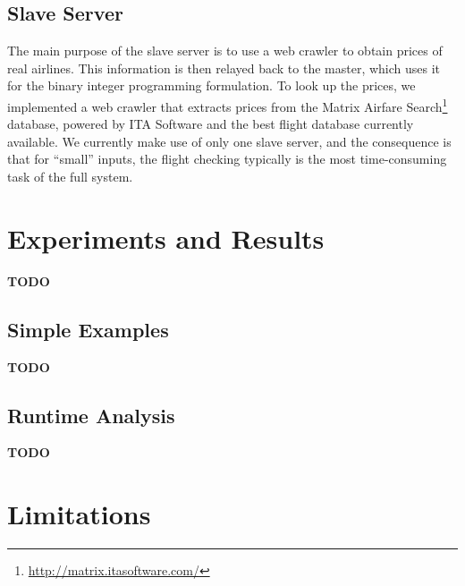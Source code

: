 \documentclass{article}
\begin{document}
\subsection{Slave Server}\label{sec:slave_server}

The main purpose of the slave server is to use a web crawler to obtain prices of real airlines. This information is then relayed back to the master,
which uses it for the binary integer programming formulation. To look up the prices, we implemented a web crawler that extracts prices from the Matrix
Airfare Search\footnote{\url{http://matrix.itasoftware.com/}} database, powered by ITA Software and the best flight database currently available. We
currently make use of only one slave server, and the consequence is that for ``small'' inputs, the flight checking typically is the most
time-consuming task of the full system.



\section{Experiments and Results}\label{sec:experiments_results}

{\bf TODO}

\subsection{Simple Examples}
{\bf TODO}

\subsection{Runtime Analysis}
{\bf TODO}



\section{Limitations}\label{sec:limitations}
\end{document}
